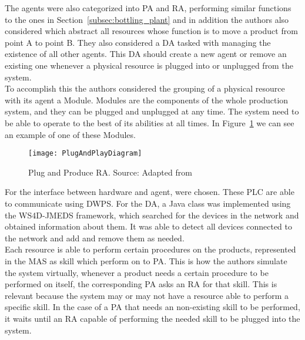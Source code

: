 The agents were also categorized into \acrshort{PA} and \acrshort{RA}, performing similar functions to the ones in Section~\ref{subsec:bottling_plant} and in addition the authors also considered  which abstract all resources whose function is to move a product from point A to point B. They also considered a \acrfull{DA} tasked with managing the existence of all other agents. This \acrshort{DA} should create a new agent or remove an existing one whenever a physical resource is plugged into or unplugged from the system.\\

To accomplish this the authors considered the grouping of a physical resource with its agent a Module. Modules are the components of the whole production system, and they can be plugged and unplugged at any time. The system need to be able to operate to the best of its abilities at all times. In Figure~\ref{fig:plug_and_play_device_architecture} we can see an example of one of these Modules.\\

\begin{figure}[h!]
	\centering
	\texttt{[image: PlugAndPlayDiagram]}
	\caption{Plug and Produce \acrshort{RA}. Source: Adapted from \cite{8972169}}
	\label{fig:plug_and_play_device_architecture}
\end{figure}

For the interface between hardware and agent,  were chosen. These \acrshort{PLC} are able to communicate using \acrfull{DWPS}. For the \acrshort{DA}, a Java class was implemented using the \acrfull{WS4D-JMEDS} framework, which searched for the devices in the network and obtained information about them. It was able to detect all devices connected to the network and add and remove them as needed.\\

Each resource is able to perform certain procedures on the products, represented in the \acrshort{MAS} as skill which  perform on to \acrshort{PA}. This is how the authors simulate the system virtually, whenever a product needs a certain procedure to be performed on itself, the corresponding \acrshort{PA} asks an \acrshort{RA} for that skill. This is relevant because the system may or may not have a resource able to perform a specific skill. In the case of a \acrshort{PA} that needs an non-existing skill to be performed, it waits until an \acrshort{RA} capable of performing the needed skill to be plugged into the system.\\

